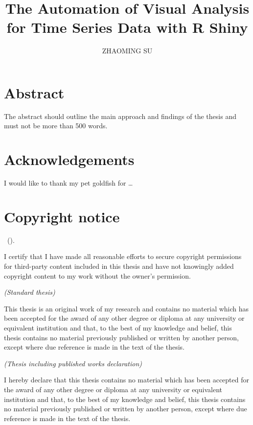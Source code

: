 \documentclass{aucklandthesis}
\author{ZHAOMING SU}
\title{The Automation of Visual Analysis for Time Series Data with R Shiny}
\begin{document}

\titlepage

{\rm\tighttoc\doublespacing}

\hypertarget{abstract}{%
\chapter*{Abstract}\label{abstract}}

The abstract should outline the main approach and findings of the thesis and must not be more than 500 words.

\newpage

\hypertarget{acknowledgements}{%
\chapter*{Acknowledgements}\label{acknowledgements}}

I would like to thank my pet goldfish for \dots

\hypertarget{copyright-notice}{%
\chapter*{Copyright notice}\label{copyright-notice}}

\textcopyright { } \authorname~(\number\the\year).

I certify that I have made all reasonable efforts to secure copyright permissions for third-party content included in this thesis and have not knowingly added copyright content to my work without the owner's permission.

\newpage

\emph{(Standard thesis)}

This thesis is an original work of my research and contains no material which has been accepted for the award of any other degree or diploma at any university or equivalent institution and that, to the best of my knowledge and belief, this thesis contains no material previously published or written by another person, except where due reference is made in the text of the thesis.

\emph{(Thesis including published works declaration)}

I hereby declare that this thesis contains no material which has been accepted for the award of any other degree or diploma at any university or equivalent institution and that, to the best of my knowledge and belief, this thesis contains no material previously published or written by another person, except where due reference is made in the text of the thesis.
\end{document}
